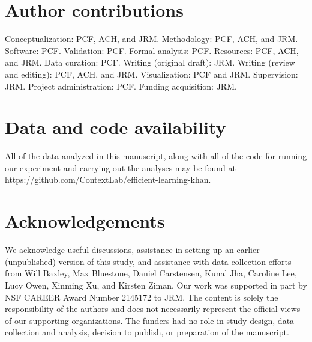 \documentclass[10pt]{article}
\begin{document}
\section*{Author contributions}

Conceptualization: PCF, ACH, and JRM. Methodology: PCF, ACH, and JRM. Software:
PCF. Validation: PCF. Formal analysis: PCF. Resources: PCF, ACH, and JRM. Data
curation: PCF. Writing (original draft): JRM. Writing (review and editing):
PCF, ACH, and JRM. Visualization: PCF and JRM. Supervision: JRM. Project
administration: PCF. Funding acquisition: JRM.


\section*{Data and code availability}

All of the data analyzed in this manuscript, along with all of the code for
running our experiment and carrying out the analyses may be found at
https://github.com/Con\-text\-Lab/eff\-ic\-ient-learn\-ing-khan.

\section*{Acknowledgements}

We acknowledge useful discussions, assistance in setting up an earlier
(unpublished) version of this study, and assistance with data
collection efforts from Will Baxley, Max Bluestone, Daniel Carstensen, Kunal
Jha, Caroline Lee, Lucy Owen, Xinming Xu, and Kirsten Ziman. Our work was
supported in part by NSF CAREER Award Number 2145172 to JRM. The content is
solely the responsibility of the authors and does not necessarily represent the
official views of our supporting organizations. The funders had no role in
study design, data collection and analysis, decision to publish, or preparation
of the manuscript.





\end{document}
